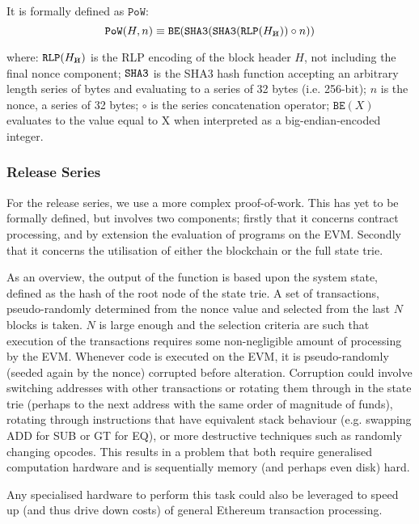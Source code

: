 \documentclass[9pt,oneside]{amsart}
\newcommand{\hcancel}[1]{%
    \tikz[baseline=(tocancel.base)]{
        \node[inner sep=0pt,outer sep=0pt] (tocancel) {#1};
        \draw[black] (tocancel.south west) -- (tocancel.north east);
    }%
}%
\begin{document}
\begin{multicols}{2}
It is formally defined as $\mathtt{PoW}$:
\begin{equation}
\mathtt{PoW}(H, n) \equiv \mathtt{BE}(\mathtt{\tiny SHA3}(\mathtt{\tiny SHA3}(\mathtt{\tiny RLP}(H_{\hcancel{n}})) \circ n))
\end{equation}

where:
$\mathtt{\tiny RLP}(H_{\hcancel{n}})$ is the RLP encoding of the block header $H$, not including the final nonce component;
$\mathtt{\tiny SHA3}$ is the SHA3 hash function accepting an arbitrary length series of bytes and evaluating to a series of 32 bytes (i.e. 256-bit);
$n$ is the nonce, a series of 32 bytes;
$\circ$ is the series concatenation operator;
$\mathtt{BE}(X)$ evaluates to the value equal to X when interpreted as a big-endian-encoded integer.

\subsubsection{Release Series}

For the release series, we use a more complex proof-of-work. This has yet to be formally defined, but involves two components; firstly that it concerns contract processing, and by extension the evaluation of programs on the EVM. Secondly that it concerns the utilisation of either the blockchain or the full state trie.

As an overview, the output of the function is based upon the system state, defined as the hash of the root node of the state trie. A set of transactions, pseudo-randomly determined from the nonce value and selected from the last $N$ blocks is taken. $N$ is large enough and the selection criteria are such that execution of the transactions requires some non-negligible amount of processing by the EVM. Whenever code is executed on the EVM, it is pseudo-randomly (seeded again by the nonce) corrupted before alteration. Corruption could involve switching addresses with other transactions or rotating them through in the state trie (perhaps to the next address with the same order of magnitude of funds), rotating through instructions that have equivalent stack behaviour (e.g. swapping {\small ADD} for {\small SUB} or {\small GT} for {\small EQ}), or more destructive techniques such as randomly changing opcodes. This results in a problem that both require generalised computation hardware and is sequentially memory (and perhaps even disk) hard.

Any specialised hardware to perform this task could also be leveraged to speed up (and thus drive down costs) of general Ethereum transaction processing.


\end{multicols}
\end{document}
